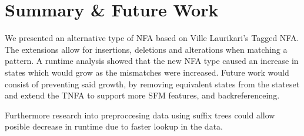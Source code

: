 \section{Summary \& Future Work}
We presented an alternative type of NFA based on Ville Laurikari's Tagged NFA.
The extensions allow for insertions, deletions and alterations when matching a pattern.
A runtime analysis showed that the new NFA type caused an increase in states which would grow as the mismatches were increased.
Future work would consist of preventing said growth, by removing equivalent states from the stateset and extend the TNFA to support more SFM features, and backreferenceing. 

Furthermore research into preproccesing data using suffix trees\cite{Algorithmonstring} could allow posible decrease in runtime due to faster lookup in the data.